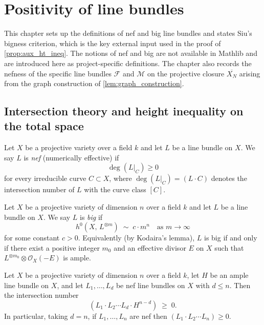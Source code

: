 \chapter{Positivity of line bundles}
\label{chap:positivity}


This chapter sets up the definitions of nef and big line bundles and states Siu's
bigness criterion, which is the key external input used in the proof of
\cref{prop:aux_ht_ineq}.  The notions of nef and big are not available in Mathlib
and are introduced here as project-specific definitions.  The chapter also records
the nefness of the specific line bundles \(\mathcal{F}\) and \(\mathcal{M}\) on the
projective closure \(\overline{X_N}\) arising from the graph construction of
\cref{lem:graph_construction}.

\section{Intersection theory and height inequality on the total space}

\begin{definition}
  \label{def:isNef}
  Let \(X\) be a projective variety over a field \(k\) and let \(L\) be a line
  bundle on \(X\).  We say \(L\) is \emph{nef} (numerically effective) if
  \[
    \deg(L|_C) \ge 0
  \]
  for every irreducible curve \(C \subset X\), where \(\deg(L|_C) = (L \cdot C)\)
  denotes the intersection number of \(L\) with the curve class \([C]\).
\end{definition}

\begin{definition}
  \label{def:isBig}
  Let \(X\) be a projective variety of dimension \(n\) over a field \(k\) and let
  \(L\) be a line bundle on \(X\).  We say \(L\) is \emph{big} if
  \[
    h^0(X,\, L^{\otimes m}) \;\sim\; c \cdot m^n \quad \text{as } m \to \infty
  \]
  for some constant \(c > 0\).  Equivalently (by Kodaira's lemma), \(L\) is big
  if and only if there exist a positive integer \(m_0\) and an effective divisor
  \(E\) on \(X\) such that \(L^{\otimes m_0} \otimes \mathcal{O}_X(-E)\) is ample.
\end{definition}

\begin{lemma}
  \label{lem:nefIntersection}
  Let \(X\) be a projective variety of dimension \(n\) over a field \(k\), let
  \(H\) be an ample line bundle on \(X\), and let \(L_1, \ldots, L_d\) be nef
  line bundles on \(X\) with \(d \le n\).  Then the intersection number
  \[
    (L_1 \cdot L_2 \cdots L_d \cdot H^{n-d}) \;\ge\; 0.
  \]
  In particular, taking \(d = n\), if \(L_1, \ldots, L_n\) are nef then
  \((L_1 \cdot L_2 \cdots L_n) \ge 0\).
\end{lemma}


